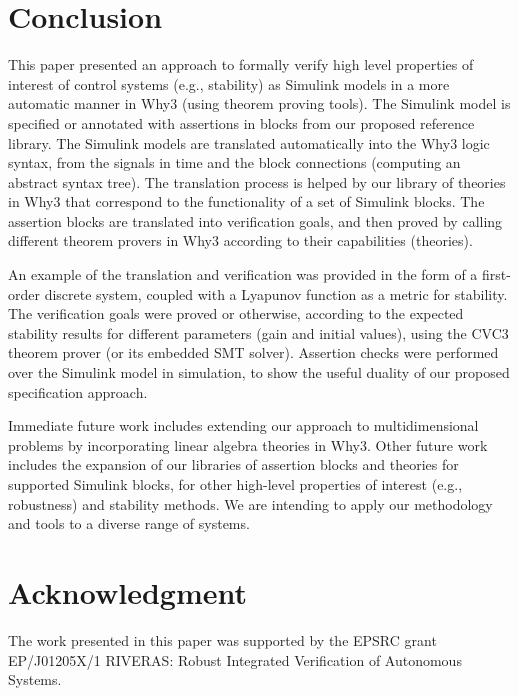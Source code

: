 \documentclass[a4paper]{article}
\begin{document}
\section{Conclusion} \label{conclusion}
This paper presented an approach to formally verify high level properties of interest of control systems (e.g., stability) as Simulink models in a more automatic manner in Why3 (using theorem proving tools). The Simulink model is specified or annotated with assertions in blocks from our proposed reference library. The Simulink models are translated automatically into the Why3 logic syntax, from the signals in time and the block connections (computing an abstract syntax tree). The translation process is helped by our library of theories in Why3 that correspond to the functionality of a set of Simulink blocks. The assertion blocks are translated into verification goals, and then proved by calling different theorem provers in Why3 according to their capabilities (theories). 

An example of the translation and verification was provided in the form of a first-order discrete system, coupled with a Lyapunov function as a metric for stability. The verification goals were proved or otherwise, according to the expected stability results for different parameters (gain and initial values), using the CVC3 theorem prover (or its embedded SMT solver). Assertion checks were performed over the Simulink model in simulation, to show the useful duality of our proposed specification approach. 

Immediate future work includes extending our approach to multidimensional problems by incorporating linear algebra theories in Why3. Other future work includes the expansion of our libraries of assertion blocks and theories for supported Simulink blocks, for other high-level properties of interest (e.g., robustness) and stability methods.  We are intending to apply our methodology and tools to a diverse range of systems.

\section*{Acknowledgment}

The work presented in this paper was supported by the EPSRC grant EP/J01205X/1 RIVERAS: Robust Integrated Verification of Autonomous Systems. 





\end{document}
